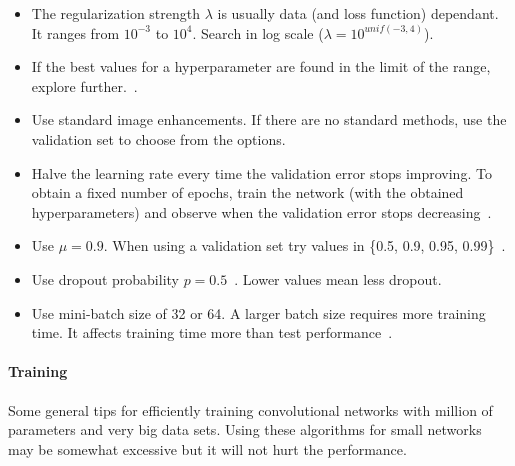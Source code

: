 \begin{itemize}
	\item The regularization strength $\lambda$ is usually data (and loss function) dependant. It ranges from $10^{-3}$ to $10^4$. Search in log scale ($\lambda = 10^{unif(-3, 4)}$).

	\item If the best values for a hyperparameter are found in the limit of the range, explore further.~\cite{Bengio2012}.

	\item Use standard image enhancements. If there are no standard methods, use the validation set to choose from the options.

	\item Halve the learning rate every time the validation error stops improving. To obtain a fixed number of epochs, train the network (with the obtained hyperparameters) and observe when the validation error stops decreasing~\cite{Krizhevsky2012}.

	\item Use $\mu=0.9$. When using a validation set try values in \{0.5, 0.9, 0.95, 0.99\}~\cite{Karpathy2015}.

	\item Use dropout probability $p = 0.5$~\cite{Karpathy2015}. Lower values mean less dropout.

	\item Use mini-batch size of 32 or 64. A larger batch size requires more training time. It affects training time more than test performance~\cite{Bengio2012}.

\end{itemize}



\paragraph{Training}
Some general tips for efficiently training convolutional networks with million of parameters and very big data sets. Using these algorithms for small networks may be somewhat excessive but it will not hurt the performance.

